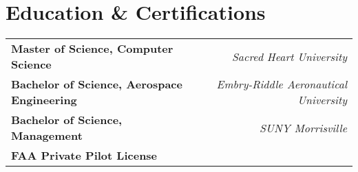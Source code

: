 \section*{Education \& Certifications}
\begin{tabularx}{\textwidth}{@{} >{\raggedright}X r @{}}
    \textbf{Master of Science, Computer Science} & \textit{Sacred Heart University} \\
    \textbf{Bachelor of Science, Aerospace Engineering} & \textit{Embry-Riddle Aeronautical University} \\
    \textbf{Bachelor of Science, Management} & \textit{SUNY Morrisville} \\
    \textbf{FAA Private Pilot License} & \\
\end{tabularx}